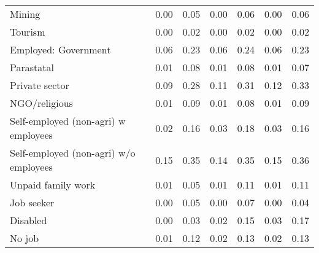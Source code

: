 \begin{table}[htbp]
\begin{tabulary}{1\textwidth}{Lcccccc}
     Mining & 0.00  & 0.05  & 0.00  & 0.06  & 0.00  & 0.06 \\
     Tourism & 0.00  & 0.02  & 0.00  & 0.02  & 0.00  & 0.02 \\
     Employed: Government & 0.06  & 0.23  & 0.06  & 0.24  & 0.06  & 0.23 \\
     Parastatal & 0.01  & 0.08  & 0.01  & 0.08  & 0.01  & 0.07 \\
     Private sector & 0.09  & 0.28  & 0.11  & 0.31  & 0.12  & 0.33 \\
     NGO/religious & 0.01  & 0.09  & 0.01  & 0.08  & 0.01  & 0.09 \\
     Self-employed (non-agri) w employees & 0.02  & 0.16  & 0.03  & 0.18  & 0.03  & 0.16 \\
     Self-employed (non-agri) w/o employees & 0.15  & 0.35  & 0.14  & 0.35  & 0.15  & 0.36 \\
     Unpaid family work & 0.01  & 0.05  & 0.01  & 0.11  & 0.01  & 0.11 \\
     
     Job seeker & 0.00  & 0.05  & 0.00  & 0.07  & 0.00  & 0.04 \\
    
     Disabled  & 0.00  & 0.03  & 0.02  & 0.15  & 0.03  & 0.17 \\
     No job & 0.01  & 0.12  & 0.02  & 0.13  & 0.02  & 0.13 \\
    \hline
    \end{tabulary}%
  \label{tab:addlabel}%
\end{table}%
 

